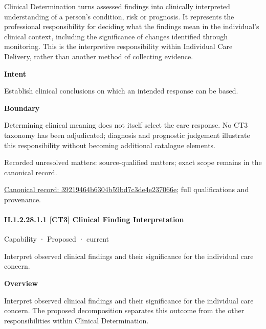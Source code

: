 Clinical Determination turns assessed findings into clinically interpreted understanding of a person's condition, risk or prognosis. It represents the professional responsibility for deciding what the findings mean in the individual's clinical context, including the significance of changes identified through monitoring. This is the interpretive responsibility within Individual Care Delivery, rather than another method of collecting evidence.



\textbf{Intent}



Establish clinical conclusions on which an intended response can be based.



\textbf{Boundary}



Determining clinical meaning does not itself select the care response. No CT3 taxonomy has been adjudicated; diagnosis and prognostic judgement illustrate this responsibility without becoming additional catalogue elements.


{\small Recorded unresolved matters: source-qualified matters; exact scope remains in the canonical record.}\par
{\footnotesize \href{../../../../continuum/strategy/capability/39219464b6304b59bd7c3de4e237066e.md}{Canonical record: 39219464b6304b59bd7c3de4e237066e}; full qualifications and provenance.}\par
\paragraph*{II.1.2.28.1.1 [CT3] Clinical Finding Interpretation}
\label{navigation:II.1.2.28.1.1}

\label{element:deb78ba3b1514074a8ca5bc5da0673f5}
{\small Capability · Proposed · current}\par

Interpret observed clinical findings and their significance for the individual care concern.



\textbf{Overview}



Interpret observed clinical findings and their significance for the individual care concern. The proposed decomposition separates this outcome from the other responsibilities within Clinical Determination.



